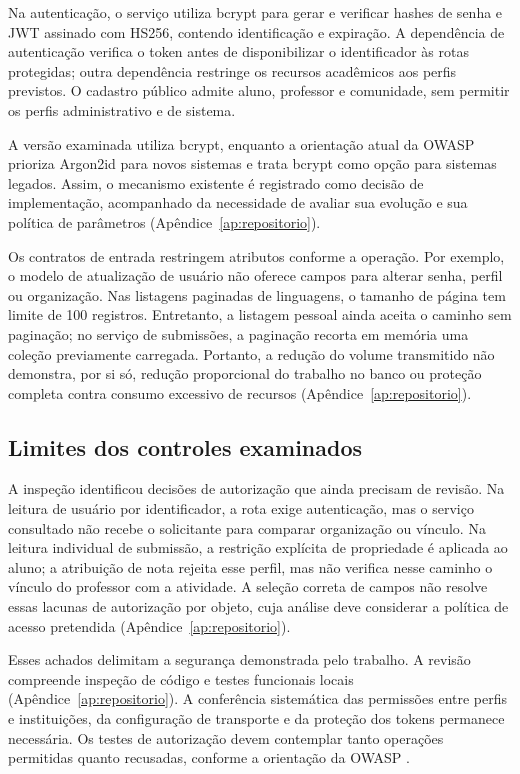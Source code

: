 Na autenticação, o serviço utiliza bcrypt para gerar e verificar hashes de senha e JWT assinado com HS256, contendo identificação e expiração. A dependência de autenticação verifica o token antes de disponibilizar o identificador às rotas protegidas; outra dependência restringe os recursos acadêmicos aos perfis previstos. O cadastro público admite aluno, professor e comunidade, sem permitir os perfis administrativo e de sistema.

A versão examinada utiliza bcrypt, enquanto a orientação atual da OWASP prioriza Argon2id para novos sistemas e trata bcrypt como opção para sistemas legados. Assim, o mecanismo existente é registrado como decisão de implementação, acompanhado da necessidade de avaliar sua evolução e sua política de parâmetros \cite{owasp2026password} (Apêndice~\ref{ap:repositorio}).

Os contratos de entrada restringem atributos conforme a operação. Por exemplo, o modelo de atualização de usuário não oferece campos para alterar senha, perfil ou organização. Nas listagens paginadas de linguagens, o tamanho de página tem limite de 100 registros. Entretanto, a listagem pessoal ainda aceita o caminho sem paginação; no serviço de submissões, a paginação recorta em memória uma coleção previamente carregada. Portanto, a redução do volume transmitido não demonstra, por si só, redução proporcional do trabalho no banco ou proteção completa contra consumo excessivo de recursos \cite{owasp2023recursos} (Apêndice~\ref{ap:repositorio}).

\subsection{Limites dos controles examinados}
\label{subsec:limites-seguranca-backend}

A inspeção identificou decisões de autorização que ainda precisam de revisão. Na leitura de usuário por identificador, a rota exige autenticação, mas o serviço consultado não recebe o solicitante para comparar organização ou vínculo. Na leitura individual de submissão, a restrição explícita de propriedade é aplicada ao aluno; a atribuição de nota rejeita esse perfil, mas não verifica nesse caminho o vínculo do professor com a atividade. A seleção correta de campos não resolve essas lacunas de autorização por objeto, cuja análise deve considerar a política de acesso pretendida \cite{owasp2023objetos} (Apêndice~\ref{ap:repositorio}).

Esses achados delimitam a segurança demonstrada pelo trabalho. A revisão compreende inspeção de código e testes funcionais locais (Apêndice~\ref{ap:repositorio}). A conferência sistemática das permissões entre perfis e instituições, da configuração de transporte e da proteção dos tokens permanece necessária. Os testes de autorização devem contemplar tanto operações permitidas quanto recusadas, conforme a orientação da OWASP \cite{owasp2026authorization,owasp2026rest}.

